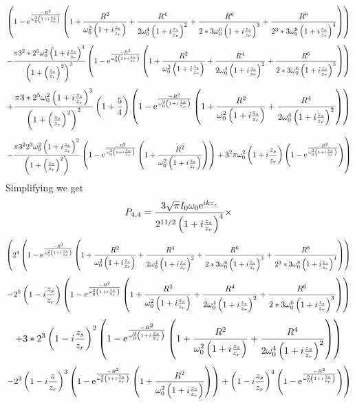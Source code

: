 \documentclass[11pt]{amsart}
\makeatletter
\newcommand{\e}{{\rm e}}				%
\newcommand{\0}{\varnothing}		%
\newcommand{\1}{!}
\newcommand{\2}{@}
\newcommand{\3}{\#}
\newcommand{\4}{\$}
\newcommand{\5}{\%}
\newcommand{\6}{$^\wedge$}
\newcommand{\7}{\&}
\newcommand{\8}{*}
\newcommand{\9}{(}
\makeatother
\begin{document}
\[\left.\left(1-\e^{\frac{-R^2}{\omega_0^2\left(1+i\frac{z_s}{z_r}\right)}}\left(1+\frac{R^2}{\omega_0^2\left(1+i\frac{z_s}{z_r}\right)}+\frac{R^4}{2\omega_0^4\left(1+i\frac{z_s}{z_r}\right)^2} + \frac{R^6}{2*3\omega_0^6\left(1+i\frac{z_s}{z_r}\right)^3}+\frac{R^8}{2^3*3\omega_0^8\left(1+i\frac{z_s}{z_r}\right)^4}\right)\right)\right.
\]
\[
\left. - \frac{\pi 3^2*2^5\omega_0^2\left(1+i\frac{z_s}{z_r}\right)^4}{\left(1+\left(\frac{z_s}{z_r}\right)^2\right)^3}\left(1-\e^{\frac{-R^2}{\omega_0^2\left(1+i\frac{z_s}{z_r}\right)}}\left(1+\frac{R^2}{\omega_0^2\left(1+i\frac{z_s}{z_r}\right)}+\frac{R^4}{2\omega_0^4\left(1+i\frac{z_s}{z_r}\right)^2} + \frac{R^6}{2*3\omega_0^6\left(1+i\frac{z_s}{z_r}\right)^3}\right)\right)\right.
\]
\[
\left.+\frac{\pi3*2^5\omega_0^2\left(1+i\frac{z_s}{z_r}\right)^3}{\left(1+\left(\frac{z_s}{z_r}\right)^2\right)^2}\left(1+\frac{5}{4}\right) \left(1-\e^{\frac{-R^2}{\omega_0^2\left(1+i\frac{z_s}{z_r}\right)}}\left(1+\frac{R^2}{\omega_0^2\left(1+i\frac{z_s}{z_r}\right)}+\frac{R^4}{2\omega_0^4\left(1+i\frac{z_s}{z_r}\right)^2} \right)\right)\right.
\]
\[
\left. -\frac{\pi3^22^3\omega_0^2\left(1+i\frac{z_s}{z_r}\right)^2}{\left(1+\left(\frac{z_s}{z_r}\right)^2\right)}\left(1-\e^{\frac{-R^2}{\omega_0^2\left(1+i\frac{z_s}{z_r}\right)}}\left(1+\frac{R^2}{\omega_0^2\left(1+i\frac{z_s}{z_r}\right)}\right)\right)+3^2\pi\omega_0^2\left(1+i\frac{z_s}{z_r}\right)\left(1-\e^{\frac{-R^2}{\omega_0^2\left(1+i\frac{z_s}{z_r}\right)}}\right)\right)
\]
Simplifying we get
\[
P_{4,4} = \frac{3\sqrt{\pi} I_0\omega_0\e^{ikz_s}}{2^{11/2}\left(1+i\frac{z_s}{z_r}\right)^4}\times
\]
\[
\left(2^4\left(1-\e^{\frac{-R^2}{\omega_0^2\left(1+i\frac{z_s}{z_r}\right)}}\left(1+\frac{R^2}{\omega_0^2\left(1+i\frac{z_s}{z_r}\right)}+\frac{R^4}{2\omega_0^4\left(1+i\frac{z_s}{z_r}\right)^2} + \frac{R^6}{2*3\omega_0^6\left(1+i\frac{z_s}{z_r}\right)^3}+\frac{R^8}{2^3*3\omega_0^8\left(1+i\frac{z_s}{z_r}\right)^4}\right)\right)\right.
\]
\[
\left. -2^5\left(1-i\frac{z_s}{z_r}\right)\left(1-\e^{\frac{-R^2}{\omega_0^2\left(1+i\frac{z_s}{z_r}\right)}}\left(1+\frac{R^2}{\omega_0^2\left(1+i\frac{z_s}{z_r}\right)}+\frac{R^4}{2\omega_0^4\left(1+i\frac{z_s}{z_r}\right)^2} + \frac{R^6}{2*3\omega_0^6\left(1+i\frac{z_s}{z_r}\right)^3}\right)\right)\right.
\]
\[
\left.+3*2^3\left(1-i\frac{z_s}{z_r}\right)^2\left(1-\e^{\frac{-R^2}{\omega_0^2\left(1+i\frac{z_s}{z_r}\right)}}\left(1+\frac{R^2}{\omega_0^2\left(1+i\frac{z_s}{z_r}\right)}+\frac{R^4}{2\omega_0^4\left(1+i\frac{z_s}{z_r}\right)^2} \right)\right)\right.
\]
\[
\left. - 2^3\left(1-i\frac{z}{z_r}\right)^3\left(1-\e^{\frac{-R^2}{\omega_0^2\left(1+i\frac{z_s}{z_r}\right)}}\left(1+\frac{R^2}{\omega_0^2\left(1+i\frac{z_s}{z_r}\right)}\right)\right) + \left(1-i\frac{z_s}{z_r}\right)^4\left(1-\e^{\frac{-R^2}{\omega_0^2\left(1+i\frac{z_s}{z_r}\right)}}\right)\right)
\]
\end{document}

